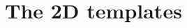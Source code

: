 \documentclass{cmspaper}
\begin{document}


\section{The 2D templates}
\label{app:appendix_2dtemplate}

\clearpage




\end{document}
